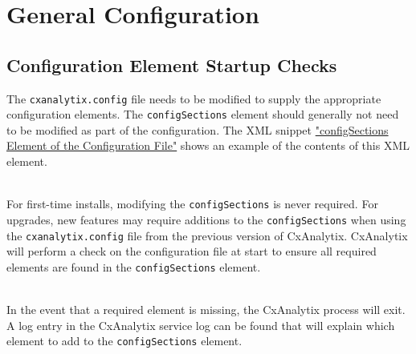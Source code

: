 \section{General Configuration}\label{sec:general}

\subsection{Configuration Element Startup Checks}

The \texttt{cxanalytix.config} file needs to be modified to supply the appropriate configuration elements.  The \texttt{configSections}
element should generally not need to be modified as part of the configuration.  
The XML snippet \hyperref[lst:motouch]{"configSections Element of the Configuration File"} shows an example of the contents of this XML element.

\noindent\\For first-time installs, modifying the \texttt{configSections} is never required.  For upgrades, new features may require additions
to the \texttt{configSections} when using the \texttt{cxanalytix.config} file from the previous version of CxAnalytix.  CxAnalytix
will perform a check on the configuration file at start to ensure all required elements are found in the \texttt{configSections} element.

\noindent\\In the event that a required element is missing, the CxAnalytix process will exit.  A log entry in the CxAnalytix service log can be found
that will explain which element to add to the \texttt{configSections} element.

